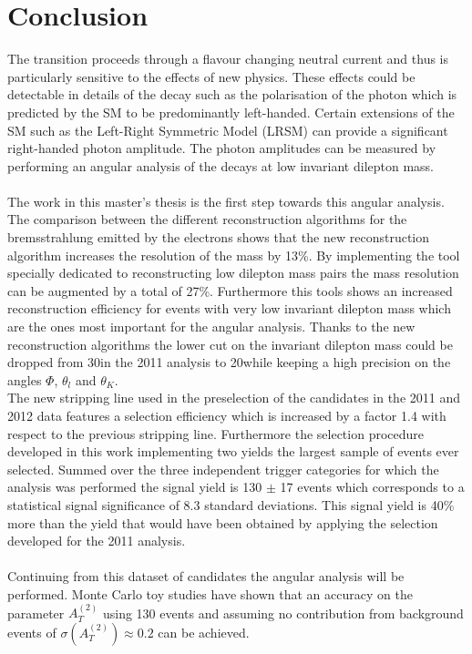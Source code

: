 \chapter{Conclusion}
\label{chapter6}
The \bsg transition proceeds through a flavour changing neutral current and thus is particularly sensitive to the effects of new physics. These effects could be detectable in details of the decay such as the polarisation of the photon which is predicted by the SM to be predominantly left-handed. Certain extensions of the SM such as the Left-Right Symmetric Model (LRSM) can provide a significant right-handed photon amplitude. The photon amplitudes can be measured by performing an angular analysis of the \BdKstee decays at low invariant dilepton mass.\\
\\
The work in this master's thesis is the first step towards this angular analysis.\\
The comparison between the different reconstruction algorithms for the bremsstrahlung emitted by the electrons shows that the new reconstruction algorithm increases the resolution of the \Bd mass by 13\%. By implementing the tool specially dedicated to reconstructing low dilepton mass pairs the \Bd mass resolution can be augmented by a total of 27\%. Furthermore this tools shows an increased reconstruction efficiency for events with very low invariant dilepton mass which are the ones most important for the angular analysis. Thanks to the new reconstruction algorithms the lower cut on the invariant dilepton mass could be dropped from 30\mevcc in the 2011 analysis to 20\mevcc while keeping a high precision on the angles $\Phi$, $\theta_l$ and $\theta_K$.\\
The new stripping line used in the preselection of the \BdKstee candidates in the 2011 and 2012 \lhcb data features a selection efficiency which is increased by a factor 1.4 with respect to the previous stripping line. Furthermore the selection procedure developed in this work implementing two \bdts yields the largest sample of \BdKstee events ever selected. Summed over the three independent trigger categories for which the analysis was performed the signal yield is 130 $\pm$ 17 events which corresponds to a statistical signal significance of 8.3 standard deviations. This signal yield is 40\% more than the yield that would have been obtained by applying the selection developed for the 2011 analysis.\\
\\
Continuing from this dataset of \BdKstee candidates the angular analysis will be performed. Monte Carlo toy studies have shown that an accuracy on the parameter $A^{(2)}_T$ using 130 \BdKstee events and assuming no contribution from background events of $\sigma(A^{(2)}_T)\approx 0.2$ can be achieved.\\
